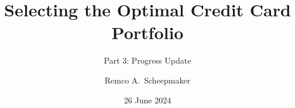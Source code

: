 \documentclass[notes,compress,sanserif,professionalfont]{beamer}
\begin{document}
\title{Selecting the Optimal Credit Card Portfolio}
\subtitle{Part 3: Progress Update}
\author{Remco A.~Scheepmaker}
\date{26 June 2024}

\begin{frame}
  \titlepage
\end{frame}



%
\end{document}
